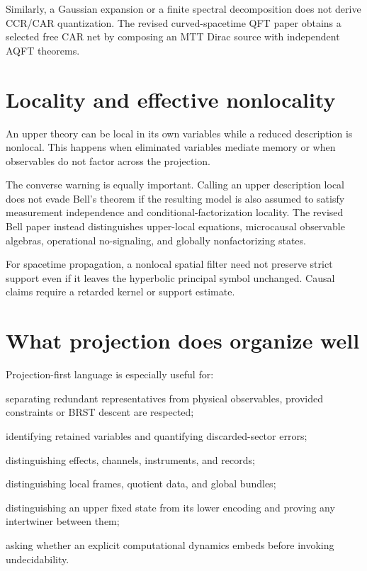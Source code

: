 \documentclass[11pt]{article}
\begin{document}
Similarly, a Gaussian expansion or a finite spectral decomposition does not
derive CCR/CAR quantization. The revised curved-spacetime QFT paper obtains a
selected free CAR net by composing an MTT Dirac source with independent AQFT
theorems.

\section{Locality and effective nonlocality}

An upper theory can be local in its own variables while a reduced
description is nonlocal. This happens when eliminated variables mediate
memory or when observables do not factor across the projection.

The converse warning is equally important. Calling an upper description
local does not evade Bell's theorem if the resulting model is also assumed
to satisfy measurement independence and conditional-factorization locality.
The revised Bell paper instead distinguishes upper-local equations,
microcausal observable algebras, operational no-signaling, and globally
nonfactorizing states.

For spacetime propagation, a nonlocal spatial filter need not preserve
strict support even if it leaves the hyperbolic principal symbol unchanged.
Causal claims require a retarded kernel or support estimate.

\section{What projection does organize well}

Projection-first language is especially useful for:
\begin{description}[leftmargin=3.0cm,style=nextline]
\item[Gauge theory] separating redundant representatives from physical
observables, provided constraints or BRST descent are respected;
\item[Effective theory] identifying retained variables and quantifying
discarded-sector errors;
\item[Measurement] distinguishing effects, channels, instruments, and
records;
\item[Geometry] distinguishing local frames, quotient data, and global
bundles;
\item[Fixed points] distinguishing an upper fixed state from its lower
encoding and proving any intertwiner between them;
\item[Computation] asking whether an explicit computational dynamics embeds
before invoking undecidability.
\end{description}
\end{document}
